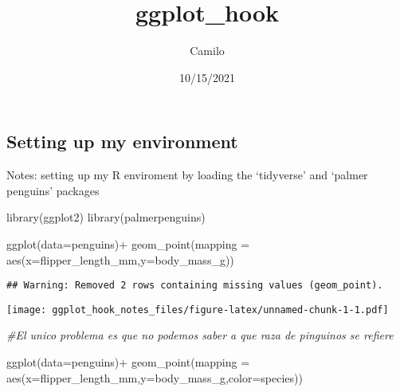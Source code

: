 \documentclass[
]{article}
\title{ggplot\_hook}
\author{Camilo}
\date{10/15/2021}
\newenvironment{Shaded}{\begin{snugshade}}{\end{snugshade}}
\newcommand{\AttributeTok}[1]{\textcolor[rgb]{0.77,0.63,0.00}{#1}}
\newcommand{\CommentTok}[1]{\textcolor[rgb]{0.56,0.35,0.01}{\textit{#1}}}
\newcommand{\FunctionTok}[1]{\textcolor[rgb]{0.00,0.00,0.00}{#1}}
\newcommand{\NormalTok}[1]{#1}
\newcommand{\SpecialCharTok}[1]{\textcolor[rgb]{0.00,0.00,0.00}{#1}}
\begin{document}
\maketitle

\hypertarget{setting-up-my-environment}{%
\subsection{Setting up my environment}\label{setting-up-my-environment}}

Notes: setting up my R enviroment by loading the `tidyverse' and `palmer
penguins' packages

\begin{Shaded}
\begin{Highlighting}[]
\FunctionTok{library}\NormalTok{(ggplot2)}
\FunctionTok{library}\NormalTok{(palmerpenguins)}
\end{Highlighting}
\end{Shaded}

\begin{Shaded}
\begin{Highlighting}[]
\FunctionTok{ggplot}\NormalTok{(}\AttributeTok{data=}\NormalTok{penguins)}\SpecialCharTok{+}
  \FunctionTok{geom\_point}\NormalTok{(}\AttributeTok{mapping =} \FunctionTok{aes}\NormalTok{(}\AttributeTok{x=}\NormalTok{flipper\_length\_mm,}\AttributeTok{y=}\NormalTok{body\_mass\_g)) }
\end{Highlighting}
\end{Shaded}

\begin{verbatim}
## Warning: Removed 2 rows containing missing values (geom_point).
\end{verbatim}

\texttt{[image: ggplot\_hook\_notes\_files/figure-latex/unnamed-chunk-1-1.pdf]}

\begin{Shaded}
\begin{Highlighting}[]
\CommentTok{\#El unico problema es que no podemos saber a que raza de pinguinos se refiere}
\end{Highlighting}
\end{Shaded}

\begin{Shaded}
\begin{Highlighting}[]
\FunctionTok{ggplot}\NormalTok{(}\AttributeTok{data=}\NormalTok{penguins)}\SpecialCharTok{+}
  \FunctionTok{geom\_point}\NormalTok{(}\AttributeTok{mapping =} \FunctionTok{aes}\NormalTok{(}\AttributeTok{x=}\NormalTok{flipper\_length\_mm,}\AttributeTok{y=}\NormalTok{body\_mass\_g,}\AttributeTok{color=}\NormalTok{species))}
\end{Highlighting}
\end{Shaded}
\end{document}
